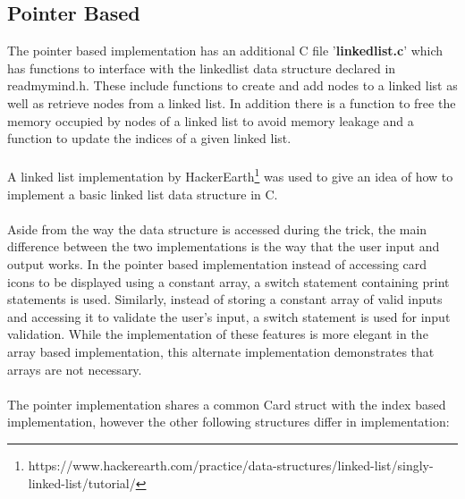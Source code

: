 \documentclass[11]{article}
\begin{document}
		\subsection{Pointer Based}
			The pointer based implementation has an additional C file '\textbf{linkedlist.c}' which has functions to interface with the linkedlist data structure declared in readmymind.h. These include functions to create and add nodes to a linked list as well as retrieve nodes from a linked list. In addition there is a function to free the memory occupied by nodes of a linked list to avoid memory leakage and a function to update the indices of a given linked list. \\\\A linked list implementation by HackerEarth\footnote{https://www.hackerearth.com/practice/data-structures/linked-list/singly-linked-list/tutorial/} was used to give an idea of how to implement a basic linked list data structure in C. \\\\ Aside from the way the data structure is accessed during the trick, the main difference between the two implementations is the way that the user input and output works. In the pointer based implementation instead of accessing card icons to be displayed using a constant array, a switch statement containing print statements is used. Similarly, instead of storing a constant array of valid inputs and accessing it to validate the user's input, a switch statement is used for input validation. While the implementation of these features is more elegant in the array based implementation, this alternate implementation demonstrates that arrays are not necessary.
			\\\\The pointer implementation shares a common Card struct with the index based implementation, however the other following structures differ in implementation:
\end{document}
